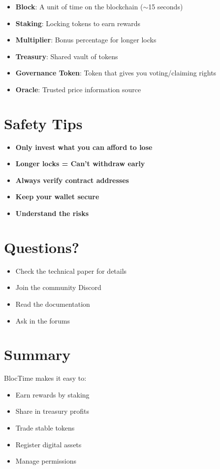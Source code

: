 \documentclass[11pt,a4paper]{article}
\begin{document}
\begin{itemize}
\item \textbf{Block}: A unit of time on the blockchain ($\sim$15 seconds)
\item \textbf{Staking}: Locking tokens to earn rewards
\item \textbf{Multiplier}: Bonus percentage for longer locks
\item \textbf{Treasury}: Shared vault of tokens
\item \textbf{Governance Token}: Token that gives you voting/claiming rights
\item \textbf{Oracle}: Trusted price information source
\end{itemize}

\section{Safety Tips}

\begin{itemize}
\item[\textcolor{red}{$\triangle$}] \textbf{Only invest what you can afford to lose}
\item[\textcolor{red}{$\triangle$}] \textbf{Longer locks = Can't withdraw early}
\item[\textcolor{red}{$\triangle$}] \textbf{Always verify contract addresses}
\item[\textcolor{red}{$\triangle$}] \textbf{Keep your wallet secure}
\item[\textcolor{red}{$\triangle$}] \textbf{Understand the risks}
\end{itemize}

\section{Questions?}

\begin{itemize}
\item Check the technical paper for details
\item Join the community Discord
\item Read the documentation
\item Ask in the forums
\end{itemize}

\section{Summary}

BlocTime makes it easy to:
\begin{itemize}
\item Earn rewards by staking
\item Share in treasury profits
\item Trade stable tokens
\item Register digital assets
\item Manage permissions
\end{itemize}
\end{document}
